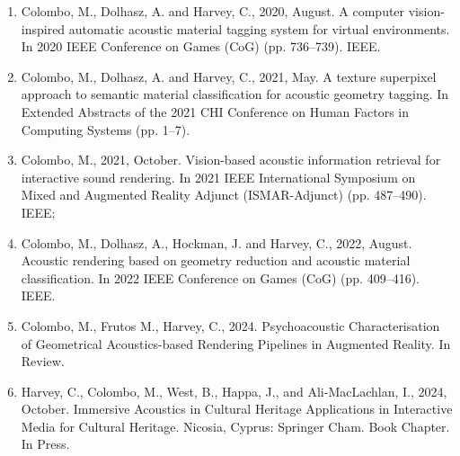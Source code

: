 \begin{enumerate}
    \item Colombo, M., Dolhasz, A. and Harvey, C., 2020, August. A computer vision-inspired automatic acoustic material tagging system for virtual environments. In 2020 IEEE Conference on Games (CoG) (pp. 736--739). IEEE.
    \item Colombo, M., Dolhasz, A. and Harvey, C., 2021, May. A texture superpixel approach to semantic material classification for acoustic geometry tagging. In Extended Abstracts of the 2021 CHI Conference on Human Factors in Computing Systems (pp. 1--7).
    \item Colombo, M., 2021, October. Vision-based acoustic information retrieval for interactive sound rendering. In 2021 IEEE International Symposium on Mixed and Augmented Reality Adjunct (ISMAR-Adjunct) (pp. 487--490). IEEE;
    \item Colombo, M., Dolhasz, A., Hockman, J. and Harvey, C., 2022, August. Acoustic rendering based on geometry reduction and acoustic material classification. In 2022 IEEE Conference on Games (CoG) (pp. 409--416). IEEE.
    \item Colombo, M., Frutos M., Harvey, C., 2024. Psychoacoustic Characterisation of Geometrical Acoustics-based Rendering Pipelines in Augmented Reality. In Review.
    \item Harvey, C., Colombo, M., West, B., Happa, J., and Ali-MacLachlan, I., 2024, October. Immersive Acoustics in Cultural Heritage Applications in Interactive Media for Cultural Heritage. Nicosia, Cyprus: Springer Cham. Book Chapter. In Press.
\end{enumerate}


